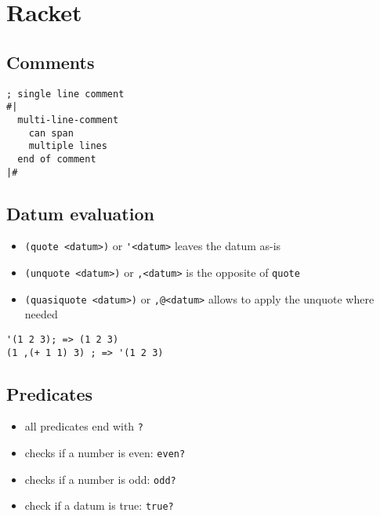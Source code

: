 \documentclass[a4paper,landscape,10pt]{article}
\begin{document}
\section{Racket}
\begin{multicols*}{2}
  \subsection{Comments}

  \begin{lstlisting}[language=Racket]
; single line comment
#|
  multi-line-comment
	can span
	multiple lines
  end of comment
|#
\end{lstlisting}

  \subsection{Datum evaluation}

  \begin{itemize}
    \item \lstinline[language=Racket]!(quote <datum>)! or \lstinline[language=Racket]!'<datum>! leaves the datum as-is
    \item \lstinline[language=Racket]!(unquote <datum>)! or \lstinline[language=Racket]!,<datum>! is the opposite of \lstinline[language=Racket]!quote!
    \item \lstinline[language=Racket]!(quasiquote <datum>)! or \lstinline[language=Racket]!,@<datum>! allows to apply the unquote where needed
  \end{itemize}

  \begin{lstlisting}[language=Racket]
'(1 2 3); => (1 2 3)
(1 ,(+ 1 1) 3) ; => '(1 2 3)
\end{lstlisting}

  \subsection{Predicates}

  \begin{itemize}
    \item all predicates end with \lstinline[language=Racket]!?!
    \item checks if a number is even: \lstinline[language=Racket]!even?!
    \item checks if a number is odd: \lstinline[language=Racket]!odd?!
    \item check if a datum is true: \lstinline[language=Racket]!true?!
  \end{itemize}


\end{multicols*}
\end{document}
